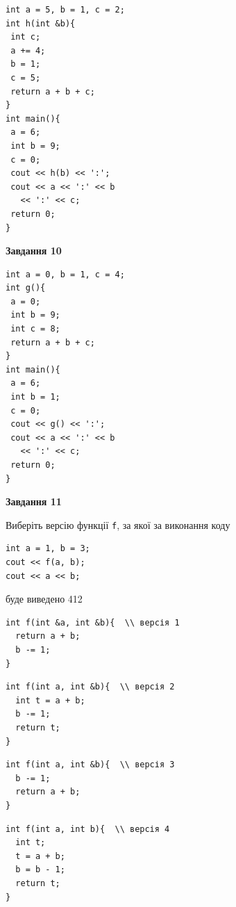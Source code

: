 \documentclass[12pt, ukrainian]{article}
\def\code#1{\Verb!#1!}
\begin{document}
{\begin {large}
\begin{minipage}[t]{7.0cm}
\begin{verbatim}
int a = 5, b = 1, c = 2;
int h(int &b){
 int c;
 a += 4;
 b = 1;
 c = 5;
 return a + b + c;
}
int main(){
 a = 6;
 int b = 9;
 c = 0;
 cout << h(b) << ':';
 cout << a << ':' << b 
   << ':' << c;
 return 0;
}
\end{verbatim}



\begin{center}
\textbf{Завдання 10}
\end{center}
\vspace{-8mm}

\begin{verbatim}
int a = 0, b = 1, c = 4;
int g(){
 a = 0;
 int b = 9;
 int c = 8;
 return a + b + c;
}
int main(){
 a = 6;
 int b = 1;
 c = 0;
 cout << g() << ':';
 cout << a << ':' << b 
   << ':' << c;
 return 0;
}
\end{verbatim}

\end{minipage}
\vline \hspace{1mm}
\begin{minipage}[t]{11.0cm}

\begin{center}
\textbf{Завдання 11}
\end{center}
Виберіть версію функції \code{f}, за якої за виконання коду
\begin{verbatim}
int a = 1, b = 3;
cout << f(a, b);
cout << a << b;
\end{verbatim}

буде виведено 412

\begin{verbatim}
int f(int &a, int &b){  \\ версія 1
  return a + b;
  b -= 1;
}
\end{verbatim}

\vspace{-8mm}\begin{verbatim}
int f(int a, int &b){  \\ версія 2
  int t = a + b;
  b -= 1;
  return t;
}
\end{verbatim}

\vspace{-8mm}\begin{verbatim}
int f(int a, int &b){  \\ версія 3
  b -= 1;
  return a + b;
}
\end{verbatim}

\vspace{-8mm}\begin{verbatim}
int f(int a, int b){  \\ версія 4
  int t;
  t = a + b;
  b = b - 1;
  return t;
}
\end{verbatim}




\end{minipage}
\end{large}}
\end{document}
